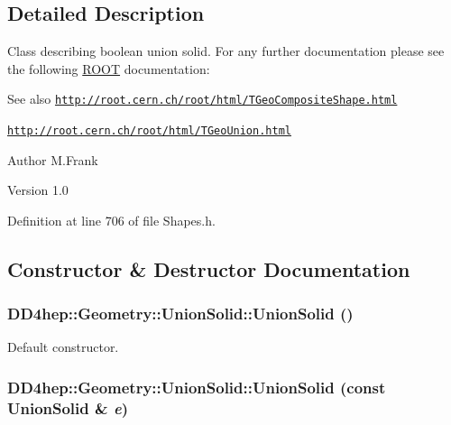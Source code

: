 \subsection{Detailed Description}
Class describing boolean union solid. For any further documentation please see the following \hyperlink{namespace_r_o_o_t}{ROOT} documentation: \begin{DoxySeeAlso}{See also}
\href{http://root.cern.ch/root/html/TGeoCompositeShape.html}{\tt http://root.cern.ch/root/html/TGeoCompositeShape.html} 

\href{http://root.cern.ch/root/html/TGeoUnion.html}{\tt http://root.cern.ch/root/html/TGeoUnion.html}
\end{DoxySeeAlso}
\begin{DoxyAuthor}{Author}
M.Frank 
\end{DoxyAuthor}
\begin{DoxyVersion}{Version}
1.0 
\end{DoxyVersion}


Definition at line 706 of file Shapes.h.

\subsection{Constructor \& Destructor Documentation}
\hypertarget{class_d_d4hep_1_1_geometry_1_1_union_solid_abf1979091a6225ca36608b19d00e48b0}{
\subsubsection[{UnionSolid}]{\setlength{\rightskip}{0pt plus 5cm}DD4hep::Geometry::UnionSolid::UnionSolid ()}}
\label{class_d_d4hep_1_1_geometry_1_1_union_solid_abf1979091a6225ca36608b19d00e48b0}


Default constructor. \hypertarget{class_d_d4hep_1_1_geometry_1_1_union_solid_a53a4143df5a2039f5ec1e5289f03fe6a}{
\subsubsection[{UnionSolid}]{\setlength{\rightskip}{0pt plus 5cm}DD4hep::Geometry::UnionSolid::UnionSolid (const {\bf UnionSolid} \& {\em e})}}
\label{class_d_d4hep_1_1_geometry_1_1_union_solid_a53a4143df5a2039f5ec1e5289f03fe6a}


